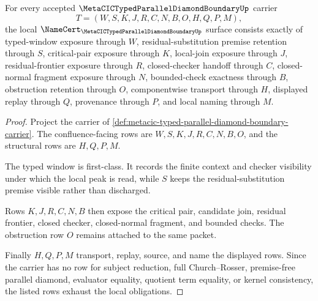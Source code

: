 \begin{theorem}
\label{thm:metacic-typed-parallel-diamond-boundary-obligations}
For every accepted $\MetaCICTypedParallelDiamondBoundaryUp$ carrier
$$
T=(W,S,K,J,R,C,N,B,O,H,Q,P,M),
$$
the local $\NameCert_{\MetaCICTypedParallelDiamondBoundaryUp}$ surface consists exactly of typed-window exposure through $W$, residual-substitution premise retention through $S$, critical-pair exposure through $K$, local-join exposure through $J$, residual-frontier exposure through $R$, closed-checker handoff through $C$, closed-normal fragment exposure through $N$, bounded-check exactness through $B$, obstruction retention through $O$, componentwise transport through $H$, displayed replay through $Q$, provenance through $P$, and local naming through $M$.
\end{theorem}
\begin{proof}
Project the carrier of \autoref{def:metacic-typed-parallel-diamond-boundary-carrier}. The confluence-facing rows are $W,S,K,J,R,C,N,B,O$, and the structural rows are $H,Q,P,M$.

The typed window is first-class. It records the finite context and checker visibility under which the local peak is read, while $S$ keeps the residual-substitution premise visible rather than discharged.

Rows $K,J,R,C,N,B$ then expose the critical pair, candidate join, residual frontier, closed checker, closed-normal fragment, and bounded checks. The obstruction row $O$ remains attached to the same packet.

Finally $H,Q,P,M$ transport, replay, source, and name the displayed rows. Since the carrier has no row for subject reduction, full Church--Rosser, premise-free parallel diamond, evaluator equality, quotient term equality, or kernel consistency, the listed rows exhaust the local obligations.
\end{proof}

